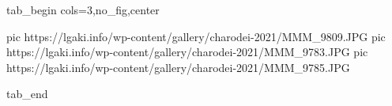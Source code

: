  
 
 
 
 


\ifcmt
  tab_begin cols=3,no_fig,center

     pic https://lgaki.info/wp-content/gallery/charodei-2021/MMM_9809.JPG
		 pic https://lgaki.info/wp-content/gallery/charodei-2021/MMM_9783.JPG
		 pic https://lgaki.info/wp-content/gallery/charodei-2021/MMM_9785.JPG

  tab_end
\fi
